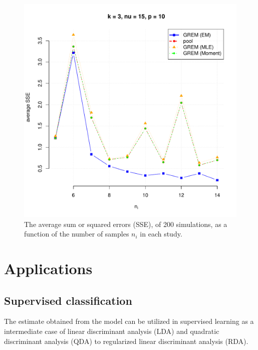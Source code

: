 \documentclass{article}\usepackage[]{graphicx}\usepackage[]{color}
\makeatletter
\def\maxwidth{ %
  \ifdim\Gin@nat@width>\linewidth
    \linewidth
  \else
    \Gin@nat@width
  \fi
}
\newenvironment{knitrout}{}{} %
\makeatother
\begin{document}
\begin{knitrout}\footnotesize
{}\color{fgcolor}\begin{figure}[ht]

\includegraphics[width=\maxwidth]{figure/num_exp_plot} \caption[The average sum or squared errors (SSE), of 200 simulations, as a function of the number of samples $n_i$ in each study]{The average sum or squared errors (SSE), of 200 simulations, as a function of the number of samples $n_i$ in each study.\label{fig:num_exp_plot}}
\end{figure}


\end{knitrout}


\section{Applications}
\subsection{Supervised classification}
The estimate obtained from the model can be utilized in supervised learning as a intermediate case of linear discriminant analysis (LDA) and quadratic discriminant analysis (QDA) to regularized linear discriminant analysis (RDA).
\end{document}

